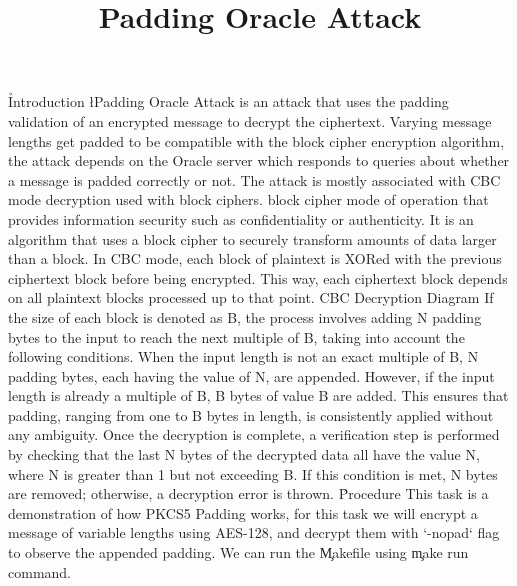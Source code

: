 \documentclass{ieee}
\title    {Padding Oracle Attack}
\begin{document}
\h{Introduction}
\l{P}adding Oracle Attack is an attack that uses the padding validation of an encrypted message to decrypt the ciphertext. Varying message lengths get padded to be compatible with the block cipher encryption algorithm, the attack depends on the Oracle server which responds to queries about whether a message is padded correctly or not. The attack is mostly associated with CBC mode decryption used with block ciphers.\cite{wiki-padding-oracle}
block cipher mode of operation that provides information security such as confidentiality or authenticity. It is an algorithm that uses a block cipher to securely transform amounts of data larger than a block. In CBC mode, each block of plaintext is XORed with the previous ciphertext block before being encrypted. This way, each ciphertext block depends on all plaintext blocks processed up to that point.\cite{wiki-cbc}
{CBC Decryption Diagram}
If the size of each block is denoted as B, the process involves adding N padding bytes to the input to reach the next multiple of B, taking into account the following conditions. When the input length is not an exact multiple of B, N padding bytes, each having the value of N, are appended. However, if the input length is already a multiple of B, B bytes of value B are added. This ensures that padding, ranging from one to B bytes in length, is consistently applied without any ambiguity. Once the decryption is complete, a verification step is performed by checking that the last N bytes of the decrypted data all have the value N, where N is greater than 1 but not exceeding B. If this condition is met, N bytes are removed; otherwise, a decryption error is thrown.\cite{cryptosys}
\h{Procedure}
This task is a demonstration of how PKCS5 Padding works, for this task we will encrypt a message of variable lengths using AES-128, and decrypt them with `-nopad` flag to observe the appended padding. We can run the \c{Makefile} using \c{make run} command.
\end{document}
